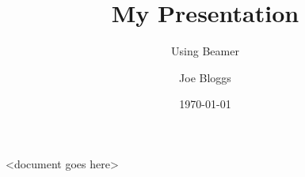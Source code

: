 \documentclass{beamer}
\title{My Presentation}
\subtitle{Using Beamer}
\author{Joe Bloggs}
\institute{University of ShareLaTeX}
\date{\today}
\begin{document}
	<document goes here>
\end{document}
